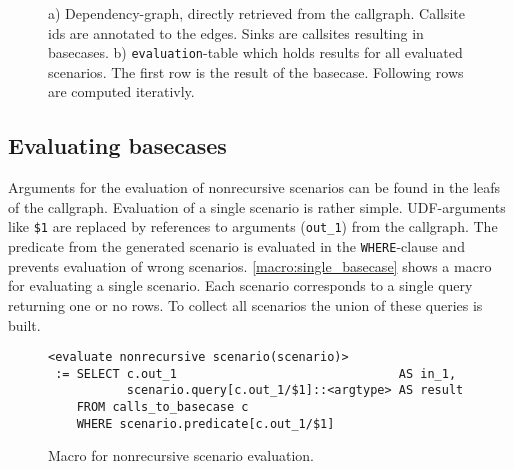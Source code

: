 \begin{figure}[h!]\small
    \begin{minipage}[b]{.45\linewidth}\small
    \centering
{}
    \subcaption{}\label{}
    \end{minipage}%
    \hfill
    \begin{minipage}[b]{.45\linewidth}\small
    \centering
    
    \subcaption{}\label{fig:fib_callstack_cte}
    \end{minipage}
    \caption{a) Dependency-graph, directly retrieved from the callgraph. Callsite ids are annotated to the edges. Sinks are callsites resulting in basecases. b) \texttt{evaluation}-table which holds results for all evaluated scenarios. The first row is the result of the basecase. Following rows are computed iterativly.}\label{}
    \vspace*{-1cm}
\end{figure}

\subsection{Evaluating basecases}
Arguments for the evaluation of nonrecursive scenarios can be found in the leafs of the callgraph.
Evaluation of a single scenario is rather simple. UDF-arguments like \texttt{\$1} are replaced by references to arguments (\texttt{out\_1}) from the callgraph. The predicate from the generated scenario is evaluated in the \texttt{WHERE}-clause and prevents evaluation of wrong scenarios. \autoref{macro:single_basecase} shows a macro for evaluating a single scenario. Each scenario corresponds to a single query returning one or no rows. To collect all scenarios the union of these queries is built.
\begin{figure}[h!]
    \centering
    \begin{verbatim}
<evaluate nonrecursive scenario(scenario)>
 := SELECT c.out_1                               AS in_1, 
           scenario.query[c.out_1/$1]::<argtype> AS result
    FROM calls_to_basecase c
    WHERE scenario.predicate[c.out_1/$1]
    \end{verbatim}
    \caption{Macro for nonrecursive scenario evaluation.}
    \label{macro:single_basecase}
\end{figure}

